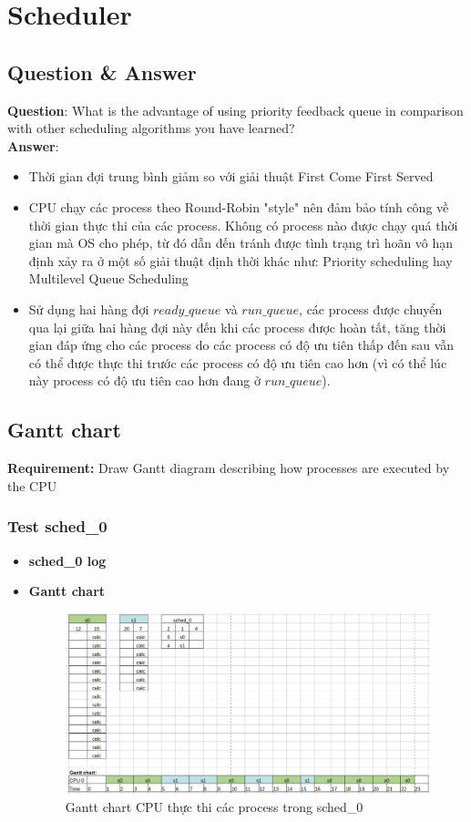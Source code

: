 \newpage
\section{Scheduler}
\subsection{Question \& Answer}
\textbf{Question}: What is the advantage of using priority feedback queue in comparison with other scheduling algorithms you have learned?\\
\textbf{Answer}:
\begin{itemize}
	\item Thời gian đợi trung bình giảm so với giải thuật First Come First Served
	\item CPU chạy các process theo Round-Robin "style" nên đảm bảo tính công về thời gian thực thi của các process. Không có process nào được chạy quá thời gian mà OS cho phép, từ đó dẫn đến tránh được tình trạng trì hoãn vô hạn định xảy ra ở một số giải thuật định thời khác như:  Priority scheduling hay Multilevel Queue Scheduling  
	\item Sử dụng hai hàng đợi  $ ready\_queue $ và $ run\_queue $, các process được chuyển qua lại giữa hai hàng đợi này đến khi các process được hoàn tất, tăng thời gian đáp ứng cho các process do các process có độ ưu tiên thấp đến sau vẫn có thể được thực thi trước các process có độ ưu tiên cao hơn (vì có thể lúc này process có độ ưu tiên cao hơn đang ở $ run\_queue $).
\end{itemize}
\subsection{Gantt chart}
\textbf{Requirement:} Draw Gantt diagram describing how processes are executed by the CPU
\subsubsection{Test sched\_0}
\begin{itemize}
	\item \textbf{sched\_0 log}
		
	\item \textbf{Gantt chart}
		\begin{figure}[h!]
		    \centering
		    \includegraphics[width=16cm]{images/sched_0.png}
		    \caption{Gantt chart CPU thực thi các process trong sched\_0}
		    \label{fig:my_label}
		\end{figure}
\end{itemize}
